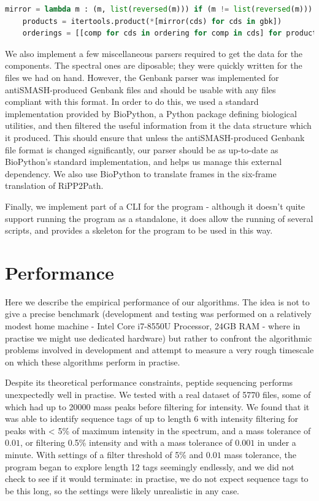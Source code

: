\documentclass{l4proj}
\begin{document}
\begin{lstlisting}[language=python, float, caption={The three lines of code used to generate all possible assembly-orderings for the alignment comparison.}, label=lst:itertoolscode]
	mirror = lambda m : (m, list(reversed(m))) if (m != list(reversed(m))) else (m,)
	products = itertools.product(*[mirror(cds) for cds in gbk])
	orderings = [[comp for cds in ordering for comp in cds] for product in products for ordering in itertools.permutations(product, len(product))]
\end{lstlisting}

We also implement a few miscellaneous parsers required to get the data for the components. The spectral ones are diposable; they were quickly written for the files we had on hand. However, the Genbank parser was implemented for antiSMASH-produced Genbank files and should be usable with any files compliant with this format. In order to do this, we used a standard implementation provided by BioPython, a Python package defining biological utilities, and then filtered the useful information from it the data structure which it produced. This should ensure that unless the antiSMASH-produced Genbank file format is changed significantly, our parser should be as up-to-date as BioPython's standard implementation, and helps us manage this external dependency. We also use BioPython to translate frames in the six-frame translation of RiPP2Path.

Finally, we implement part of a CLI for the program - although it doesn't quite support running the program as a standalone, it does allow the running of several scripts, and provides a skeleton for the program to be used in this way.

\section{Performance}

Here we describe the empirical performance of our algorithms. The idea is not to give a precise benchmark (development and testing was performed on a relatively modest home machine - Intel Core i7-8550U Processor, 24GB RAM - where in practise we might use dedicated hardware) but rather to confront the algorithmic problems involved in development and attempt to measure a very rough timescale on which these algorithms perform in practise.

Despite its theoretical performance constraints, peptide sequencing performs unexpectedly well in practise. We tested with a real dataset of 5770 files, some of which had up to 20000 mass peaks before filtering for intensity. We found that it was able to identify sequence tags of up to length 6 with intensity filtering for peaks with < 5\% of maximum intensity in the spectrum, and a mass tolerance of \(0.01\), or filtering 0.5\% intensity and with a mass tolerance of \(0.001\) in under a minute. With settings of a filter threshold of 5\% and \(0.01\) mass tolerance, the program began to explore length 12 tags seemingly endlessly, and we did not check to see if it would terminate: in practise, we do not expect sequence tags to be this long, so the settings were likely unrealistic in any case. 
\end{document}
